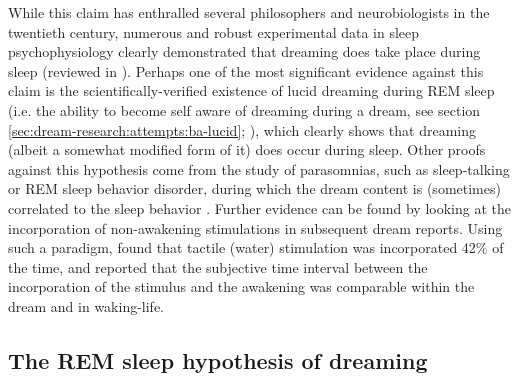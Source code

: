 While this claim has enthralled several philosophers and neurobiologists in the twentieth century, numerous and robust experimental data in sleep psychophysiology clearly demonstrated that dreaming does take place during sleep (reviewed in \citealp{guenole_reve_2010}). Perhaps one of the most significant evidence against this claim is the scientifically-verified existence of lucid dreaming during REM sleep (i.e. the ability to become self aware of dreaming during a dream, see section \ref{sec:dream-research:attempts:ba-lucid}; \citealp{laberge_exploring_1991, dresler_neural_2012}), which clearly shows that dreaming (albeit a somewhat modified form of it) does occur during sleep. Other proofs against this hypothesis come from the study of parasomnias, such as sleep-talking or REM sleep behavior disorder, during which the dream content is (sometimes) correlated to the sleep behavior \citep{ellman_mind_1991, schenck_rem_2002, leclair-visonneau_eyes_2010}. Further evidence can be found by looking at the incorporation of non-awakening stimulations in subsequent dream reports. Using such a paradigm, \citet{dement_relation_1958} found that tactile (water) stimulation was incorporated 42\% of the time, and reported that the subjective time interval between the incorporation of the stimulus and the awakening was comparable within the dream and in waking-life.

\subsection{The REM sleep hypothesis of dreaming}
\label{sec:dream-research:link:rem-sleep}

